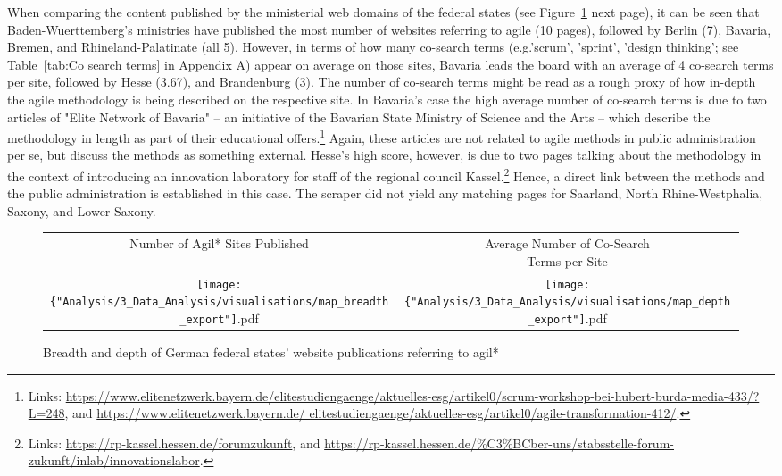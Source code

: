 When comparing the content published by the ministerial web domains of the federal states (see Figure~\ref{fig:map} next page), it can be seen that Baden-Wuerttemberg's ministries have published the most number of websites referring to agile (10 pages), followed by Berlin (7), Bavaria, Bremen, and Rhineland-Palatinate (all 5). However, in terms of how many co-search terms (e.g.'scrum', 'sprint', 'design thinking'; see Table~\ref{tab:Co search terms} in \href{Appendix A}{Appendix A}) appear on average on those sites, Bavaria leads the board with an average of 4 co-search terms per site, followed by Hesse (3.67), and Brandenburg (3). The number of co-search terms might be read as a rough proxy of how in-depth the agile methodology is being described on the respective site. In Bavaria's case the high average number of co-search terms is due to two articles of "Elite Network of Bavaria" – an initiative of the Bavarian State Ministry of Science and the Arts – which describe the methodology in length as part of their educational offers.\footnote{Links: \href{https://www.elitenetzwerk.bayern.de/elitestudiengaenge/aktuelles-esg/artikel0/scrum-workshop-bei-hubert-burda-media-433/?L=248}{https://www.elitenetzwerk.bayern.de/elitestudiengaenge/aktuelles-esg/artikel0/scrum-workshop-bei-hubert-burda-media-433/?L=248}, and \href{https://www.elitenetzwerk.bayern.de/elitestudiengaenge/aktuelles-esg/artikel0/agile-transformation-412/}{https://www.elitenetzwerk.bayern.de/ elitestudiengaenge/aktuelles-esg/artikel0/agile-transformation-412/}.} Again, these articles are not related to agile methods in public administration per se, but discuss the methods as something external. Hesse's high score, however, is due to two pages talking about the methodology in the context of introducing an innovation laboratory for staff of the regional council Kassel.\footnote{Links: \href{https://rp-kassel.hessen.de/forumzukunft}{  https://rp-kassel.hessen.de/forumzukunft}, and \href{https://rp-kassel.hessen.de/\%C3\%BCber-uns/stabsstelle-forum-zukunft/inlab/innovationslabor}{https://rp-kassel.hessen.de/\%C3\%BCber-uns/stabsstelle-forum-zukunft/inlab/innovationslabor}.} Hence, a direct link between the methods and the public administration is established in this case. The scraper did not yield any matching pages for Saarland, North Rhine-Westphalia, Saxony, and Lower Saxony.
\begin{figure}[ht!]
	\centering
	\begin{tabular}{c c}
    Number of Agil* Sites Published & \makecell{Average Number of Co-Search \\ Terms per Site} \\
	\texttt{[image: \{"Analysis/3\_Data\_Analysis/visualisations/map\_breadth\_export"]}.pdf} &
	\texttt{[image: \{"Analysis/3\_Data\_Analysis/visualisations/map\_depth\_export"]}.pdf}
	\end{tabular}
	\setlength{\belowcaptionskip}{-10pt}
	\caption[Breadth and depth of German federal states' website publications referring to agil*]{Breadth and depth of German federal states' website publications referring to agil*}
	\label{fig:map}
\end{figure}

